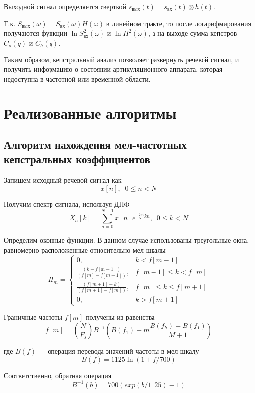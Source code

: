 \documentclass[14pt,russian,utf8,nocolumnsxix]{extarticle}
\begin{document}
Выходной сигнал определяется сверткой $s_{вых}(t)=s_{вх}(t)\otimes h(t)$.


Т.к. $S_{вых}(\omega)=S_{вх}(\omega)H(\omega)$ в линейном тракте, то после логарифмирования получаются функции $\ln S_{вх}^{2}(\omega)$ и $\ln H^{2}(\omega)$, а на выходе сумма кепстров $C_{s}(q)$ и $C_{h}(q)$.

Таким образом, кепстральный анализ позволяет развернуть речевой сигнал, и получить информацию о состоянии артикуляционного аппарата, которая недоступна в частотной или временной области.



\pagebreak
\section {Реализованные алгоритмы}
\subsection{Алгоритм нахождения мел-частотных кепстральных коэффициентов}


Запишем исходный речевой сигнал как  
\[
	x[n], \; \; 0 \leq n < N 
\]

Получим спектр сигнала, используя ДПФ
\[
	X_{a}[k]=\sum_{n=0}^{N-1}{x[n]e^{\frac{-2\pi i}{N}kn}}, \; \;  0 \leq k < N
\]

Определим оконные функции. В данном случае использованы треугольные окна, равномерно расположенные относительно мел-шкалы
\[
	H_{m}=
	\begin{cases}
		0,&k<f[m-1]\\ 
		\frac{(k-f[m-1])}{(f[m]-f[m-1])},&f[m-1] \leq k < f[m]\\ 
		\frac{(f[m+1]-k)}{(f[m+1]-f[m])},&f[m] \leq k \leq f[m+1]\\ 
		0,&k > f[m+1]
\end{cases}
\]

Граничные частоты $f[m]$ получены из равенства
\[
	f[m]=(\frac{N}{F_{s}})B^{-1}(B(f_{1})+m\frac{B(f_{h})-B(f_{1})}{M+1})
\]

где $B(f)$ --- операция перевода значений частоты в мел-шкалу
\[
	B(f)=1125\ln(1+f/700)
\]

Соответственно, обратная операция
\[
	B^{-1}(b)=700(exp(b/1125)-1)
\]
\end{document}
